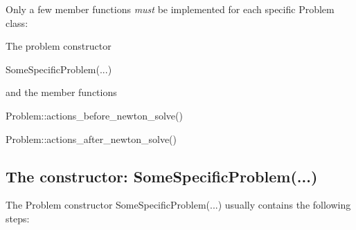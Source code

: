 Only a few member functions {\itshape must} be implemented for each specific {\ttfamily Problem} class\+:
\begin{DoxyItemize}
\item The problem constructor
\begin{DoxyCode}
SomeSpecificProblem(...) 
\end{DoxyCode}

\item and the member functions 
\begin{DoxyCode}
Problem::actions\_before\_newton\_solve() 
\end{DoxyCode}
 
\begin{DoxyCode}
Problem::actions\_after\_newton\_solve() 
\end{DoxyCode}

\end{DoxyItemize}\hypertarget{index_spec}{}\subsection{The constructor\+: Some\+Specific\+Problem(...)}\label{index_spec}
The Problem constructor {\ttfamily Some\+Specific\+Problem}(...) usually contains the following steps\+:
